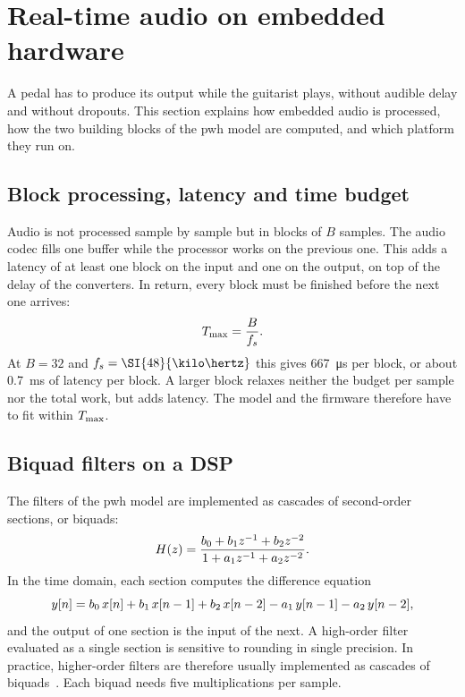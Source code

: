 \section{Real-time audio on embedded hardware}
\label{sec:background_realtime}

A pedal has to produce its output while the guitarist plays, without audible delay and without dropouts. This section explains how embedded audio is processed, how the two building blocks of the \gls{pwh} model are computed, and which platform they run on.

\subsection{Block processing, latency and time budget}
\label{subsec:background_block_processing}

Audio is not processed sample by sample but in blocks of $B$ samples. The audio codec fills one buffer while the processor works on the previous one. This adds a latency of at least one block on the input and one on the output, on top of the delay of the converters. In return, every block must be finished before the next one arrives:
\begin{equation}
  T\sb{\max} = \frac{B}{f\sb{s}}.
  \label{eq:budget}
\end{equation}
At $B = 32$ and $f\sb{s} = \SI{48}{\kilo\hertz}$ this gives \SI{667}{\micro\second} per block, or about \SI{0.7}{\milli\second} of latency per block. A larger block relaxes neither the budget per sample nor the total work, but adds latency. The model and the firmware therefore have to fit within $T\sb{\max}$.

\subsection{Biquad filters on a DSP}
\label{subsec:background_biquads}

The filters of the \gls{pwh} model are implemented as cascades of second-order sections, or biquads:
\begin{equation}
  H(z) = \frac{b\sb{0} + b\sb{1} z^{-1} + b\sb{2} z^{-2}}{1 + a\sb{1} z^{-1} + a\sb{2} z^{-2}}.
  \label{eq:biquad}
\end{equation}
In the time domain, each section computes the difference equation
\begin{equation}
  y[n] = b\sb{0}\, x[n] + b\sb{1}\, x[n-1] + b\sb{2}\, x[n-2] - a\sb{1}\, y[n-1] - a\sb{2}\, y[n-2],
  \label{eq:biquad_diff}
\end{equation}
and the output of one section is the input of the next. A high-order filter evaluated as a single section is sensitive to rounding in single precision. In practice, higher-order filters are therefore usually implemented as cascades of biquads~\cite{zoelzer2011dafx}. Each biquad needs five multiplications per sample.

